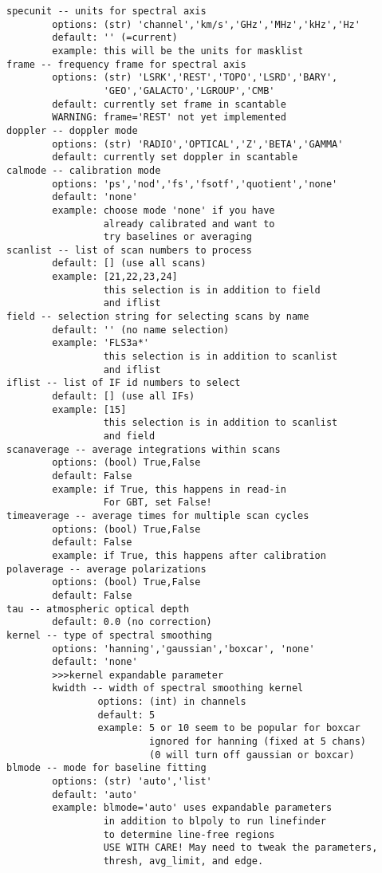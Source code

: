 \begin{verbatim}
specunit -- units for spectral axis
        options: (str) 'channel','km/s','GHz','MHz','kHz','Hz'
        default: '' (=current)
        example: this will be the units for masklist
frame -- frequency frame for spectral axis
        options: (str) 'LSRK','REST','TOPO','LSRD','BARY',
                 'GEO','GALACTO','LGROUP','CMB'
        default: currently set frame in scantable
        WARNING: frame='REST' not yet implemented
doppler -- doppler mode
        options: (str) 'RADIO','OPTICAL','Z','BETA','GAMMA'
        default: currently set doppler in scantable
calmode -- calibration mode
        options: 'ps','nod','fs','fsotf','quotient','none'
        default: 'none'
        example: choose mode 'none' if you have
                 already calibrated and want to
                 try baselines or averaging
scanlist -- list of scan numbers to process
        default: [] (use all scans)
        example: [21,22,23,24]
                 this selection is in addition to field
                 and iflist
field -- selection string for selecting scans by name
        default: '' (no name selection)
        example: 'FLS3a*'
                 this selection is in addition to scanlist
                 and iflist
iflist -- list of IF id numbers to select
        default: [] (use all IFs)
        example: [15]
                 this selection is in addition to scanlist
                 and field
scanaverage -- average integrations within scans
        options: (bool) True,False
        default: False
        example: if True, this happens in read-in
                 For GBT, set False!
timeaverage -- average times for multiple scan cycles
        options: (bool) True,False
        default: False
        example: if True, this happens after calibration
polaverage -- average polarizations
        options: (bool) True,False
        default: False
tau -- atmospheric optical depth
        default: 0.0 (no correction)
kernel -- type of spectral smoothing
        options: 'hanning','gaussian','boxcar', 'none'
        default: 'none'
        >>>kernel expandable parameter
        kwidth -- width of spectral smoothing kernel
                options: (int) in channels
                default: 5
                example: 5 or 10 seem to be popular for boxcar
                         ignored for hanning (fixed at 5 chans)
                         (0 will turn off gaussian or boxcar)
blmode -- mode for baseline fitting
        options: (str) 'auto','list'
        default: 'auto'
        example: blmode='auto' uses expandable parameters
                 in addition to blpoly to run linefinder
                 to determine line-free regions
                 USE WITH CARE! May need to tweak the parameters,
                 thresh, avg_limit, and edge.


\end{verbatim}
